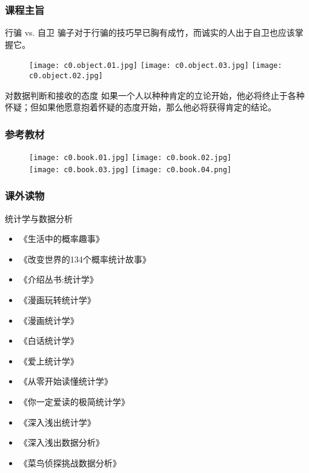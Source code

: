 \begin{frame}
  \frametitle{课程主旨}
  \begin{block}{行骗 vs. 自卫}
    骗子对于行骗的技巧早已胸有成竹，而诚实的人出于自卫也应该掌握它。
  \end{block}
  \vspace{-0.5em}
  \begin{figure}
    \centering
    \texttt{[image: c0.object.01.jpg]}
    \texttt{[image: c0.object.03.jpg]}
    \texttt{[image: c0.object.02.jpg]}
  \end{figure}
  \vspace{-0.5em}
  \begin{block}{对数据判断和接收的态度}
    如果一个人以种种肯定的立论开始，他必将终止于各种怀疑；但如果他愿意抱着怀疑的态度开始，那么他必将获得肯定的结论。
  \end{block}
\end{frame}

\begin{frame}
  \frametitle{参考教材}
  \begin{figure}
    \centering
    \texttt{[image: c0.book.01.jpg]}\qquad
    \texttt{[image: c0.book.02.jpg]}\\
    \texttt{[image: c0.book.03.jpg]}\qquad
    \texttt{[image: c0.book.04.png]}
  \end{figure}
\end{frame}

\begin{frame}
  \frametitle{课外读物}
    \begin{block}{统计学与数据分析}
      \begin{multicols}{2}
      \begin{itemize}
         \item 《生活中的概率趣事》
         \item 《改变世界的134个概率统计故事》
         \item 《介绍丛书:统计学》
         \item 《漫画玩转统计学》
         \item 《漫画统计学》
         \item 《白话统计学》
         \item 《爱上统计学》
         \item 《从零开始读懂统计学》
         \item 《你一定爱读的极简统计学》
         \item 《深入浅出统计学》
         \item 《深入浅出数据分析》
         \item 《菜鸟侦探挑战数据分析》
        \end{itemize}
      \end{multicols}
    \end{block}
\end{frame}

